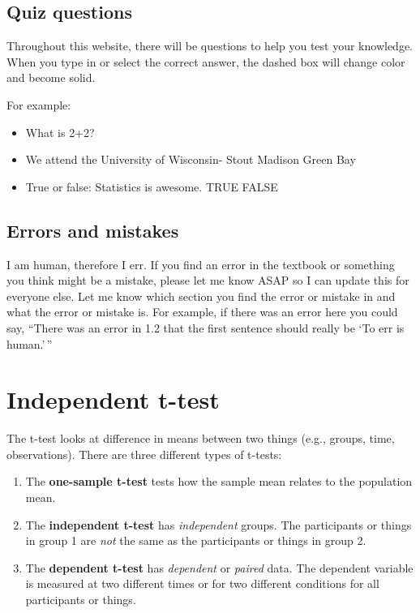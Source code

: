 \documentclass[
]{book}
\begin{document}
\hypertarget{quiz-questions}{%
\section{Quiz questions}\label{quiz-questions}}

Throughout this website, there will be questions to help you test your knowledge. When you type in or select the correct answer, the dashed box will change color and become solid.

For example:

\begin{itemize}
\item
  What is 2+2?
\item
  We attend the University of Wisconsin- Stout Madison Green Bay
\item
  True or false: Statistics is awesome. TRUE FALSE
\end{itemize}

\hypertarget{errors-and-mistakes}{%
\section{Errors and mistakes}\label{errors-and-mistakes}}

I am human, therefore I err. If you find an error in the textbook or something you think might be a mistake, please let me know ASAP so I can update this for everyone else. Let me know which section you find the error or mistake in and what the error or mistake is. For example, if there was an error here you could say, ``There was an error in 1.2 that the first sentence should really be `To err is human.'\,''

\hypertarget{independent-t-test}{%
\chapter{Independent t-test}\label{independent-t-test}}

The t-test looks at difference in means between two things (e.g., groups, time, observations). There are three different types of t-tests:

\begin{enumerate}
\def\labelenumi{\arabic{enumi}.}
\item
  The \textbf{one-sample t-test} tests how the sample mean relates to the population mean.
\item
  The \textbf{independent t-test} has \emph{independent} groups. The participants or things in group 1 are \emph{not} the same as the participants or things in group 2.
\item
  The \textbf{dependent t-test} has \emph{dependent} or \emph{paired} data. The dependent variable is measured at two different times or for two different conditions for all participants or things.
\end{enumerate}
\end{document}
